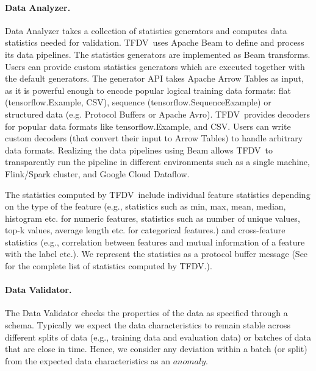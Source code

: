 \documentclass[11pt]{article}
\newcommand{\tfdv}{{\sf TFDV}}
\begin{document}
\paragraph{Data Analyzer.} Data Analyzer takes a collection of statistics generators and computes data statistics needed for validation. \tfdv\ uses Apache Beam \cite{beam} to define and process its data pipelines. The statistics generators are implemented as Beam transforms. Users can provide custom statistics generators which are executed together with the default generators.
The generator API takes Apache Arrow Tables as input, as it is powerful enough to encode popular logical training data formats: flat (tensorflow.Example, CSV), sequence (tensorflow.SequenceExample) or structured data (e.g. Protocol Buffers or Apache Avro). \tfdv\  provides decoders for popular data formats like tensorflow.Example, and CSV. Users can write custom decoders (that convert their input to Arrow Tables) to handle arbitrary data formats. Realizing the data pipelines using Beam allows \tfdv\ to transparently run the pipeline in different environments such as a single machine, Flink/Spark cluster, and Google Cloud Dataflow.

The statistics computed by \tfdv\ include individual feature statistics depending on the type of the feature (e.g., statistics such as min, max, mean, median, histogram etc. for numeric features, statistics such as number of unique values, top-k values, average length etc. for categorical features.) and cross-feature statistics (e.g., correlation between features and mutual information of a feature with the label etc.). We represent the statistics as a protocol buffer message (See \cite{tfmd} for the complete list of statistics computed by \tfdv.).

\paragraph{Data Validator.} The Data Validator checks the properties of the data as specified through a schema. Typically we expect the data characteristics to remain stable across different splits of data (e.g., training data and evaluation data) or batches of data that are close in time. Hence, we consider any deviation within a batch (or split) from the expected data characteristics as an $anomaly$.
\end{document}
